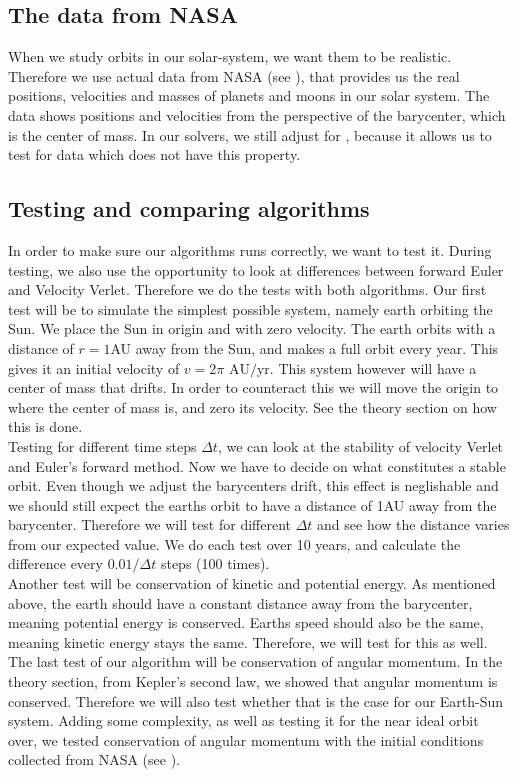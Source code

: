 \documentclass[reprint, english,notitlepage,nofootinbib]{revtex4-1}  %
\begin{document}
\subsection{The data from NASA}
When we study orbits in our solar-system, we want them to be realistic. Therefore we use actual data from NASA (see \citep{NASA}), that provides us the real positions, velocities and masses of planets and moons in our solar system. The data shows positions and velocities from the perspective of the barycenter, which is the center of mass. In our solvers, we still adjust for , because it allows us to test for data which does not have this property. 

\subsection{Testing and comparing algorithms}
In order to make sure our algorithms runs correctly, we want to test it. During testing, we also use the opportunity to look at differences between forward Euler and Velocity Verlet. Therefore we do the tests with both algorithms. Our first test will be to simulate the simplest possible system, namely earth orbiting the Sun. We place the Sun in origin and with zero velocity. The earth orbits with a distance of $r=1$AU away from the Sun, and makes a full orbit every year. This gives it an initial velocity of $v = 2\pi \text{ AU}/\text{yr}.$ This system however will have a center of mass that drifts. In order to counteract this we will move the origin to where the center of mass is, and zero its velocity. See the theory section on how this is done.
\\
Testing for different time steps $\Delta t$, we can look at the stability of velocity Verlet and Euler's forward method. Now we have to decide on what constitutes a stable orbit. Even though we adjust the barycenters drift, this effect is neglishable and we should still expect the earths orbit to have a distance of 1AU away from the barycenter. Therefore we will test for different $\Delta t$ and see how the distance varies from our expected value. We do each test over 10 years, and calculate the difference every $0.01/\Delta t$ steps (100 times).
\\
Another test will be conservation of kinetic and potential energy. As mentioned above, the earth should have a constant distance away from the barycenter, meaning potential energy is conserved. Earths speed should also be the same, meaning kinetic energy stays the same. Therefore, we will test for this as well. 
\\
The last test of our algorithm will be conservation of angular momentum. In the theory section, from Kepler's second law, we showed that angular momentum is conserved. Therefore we will also test whether that is the case for our Earth-Sun system. Adding some complexity, as well as testing it for the near ideal orbit over, we tested conservation of angular momentum with the initial conditions collected from NASA (see \citep{NASA}).
\end{document}
